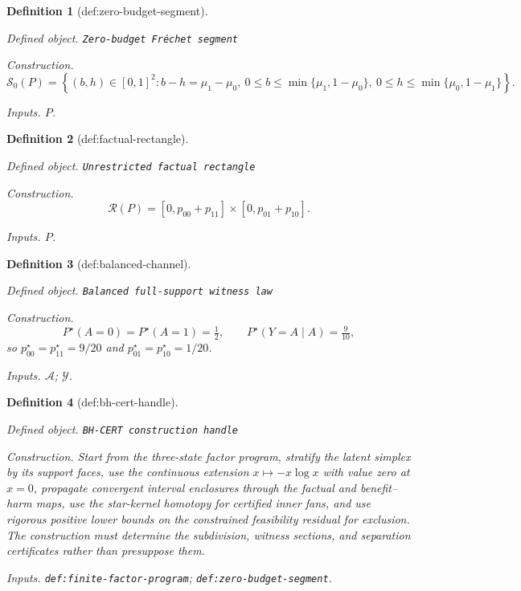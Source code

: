 \documentclass{article}
\newtheorem{definition}{Definition}
\begin{document}
\begin{definition}[def:zero-budget-segment]\label{def:zero-budget-segment}
\par\smallskip\noindent\emph{Defined object.} \texttt{Zero-\allowbreak{}budget Fréchet segment}
\par\smallskip\noindent\emph{Construction.} \[\mathcal S_0(P)=\left\{(b,h)\in[0,1]^2:b-h=\mu_1-\mu_0,\ 0\leq b\leq\min\{\mu_1,1-\mu_0\},\ 0\leq h\leq\min\{\mu_0,1-\mu_1\}\right\}.\]
\par\smallskip\noindent\emph{Inputs.} \(P\).
\end{definition}

\begin{definition}[def:factual-rectangle]\label{def:factual-rectangle}
\par\smallskip\noindent\emph{Defined object.} \texttt{Unrestricted factual rectangle}
\par\smallskip\noindent\emph{Construction.} \[\mathcal R(P)=[0,p_{00}+p_{11}]\times[0,p_{01}+p_{10}].\]
\par\smallskip\noindent\emph{Inputs.} \(P\).
\end{definition}

\begin{definition}[def:balanced-channel]\label{def:balanced-channel}
\par\smallskip\noindent\emph{Defined object.} \texttt{Balanced full-\allowbreak{}support witness law}
\par\smallskip\noindent\emph{Construction.} \[P^\star(A=0)=P^\star(A=1)=\tfrac12,\qquad P^\star(Y=A\mid A)=\tfrac9{10},\] so \(p^\star_{00}=p^\star_{11}=9/20\) and \(p^\star_{01}=p^\star_{10}=1/20\).
\par\smallskip\noindent\emph{Inputs.} \(\mathcal A\); \(\mathcal Y\).
\end{definition}

\begin{definition}[def:bh-cert-handle]\label{def:bh-cert-handle}
\par\smallskip\noindent\emph{Defined object.} \texttt{BH-\allowbreak{}CERT construction handle}
\par\smallskip\noindent\emph{Construction.} Start from the three-state factor program, stratify the latent simplex by its support faces, use the continuous extension \(x\mapsto-x\log x\) with value zero at \(x=0\), propagate convergent interval enclosures through the factual and benefit--harm maps, use the star-kernel homotopy for certified inner fans, and use rigorous positive lower bounds on the constrained feasibility residual for exclusion. The construction must determine the subdivision, witness sections, and separation certificates rather than presuppose them.
\par\smallskip\noindent\emph{Inputs.} \texttt{def:\allowbreak{}finite-\allowbreak{}factor-\allowbreak{}program}; \texttt{def:\allowbreak{}zero-\allowbreak{}budget-\allowbreak{}segment}.
\end{definition}
\end{document}
